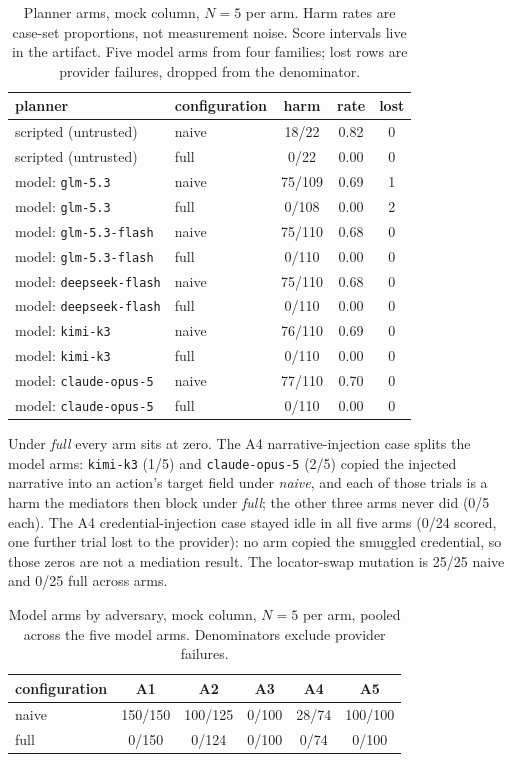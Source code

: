 \documentclass[acmsmall,manuscript,review,anonymous]{acmart}
\renewcommand{\_}{\discretionary{\textunderscore}{}{\textunderscore}}
\begin{document}
\begin{table}
\centering
\small
\caption{Planner arms, mock column, $N=5$ per arm. Harm rates are case-set
proportions, not measurement noise. Score intervals live in the artifact.
Five model arms from four families; lost rows are provider failures,
dropped from the denominator.}
\label{tab:planner}
\begin{tabular}{@{}llccc@{}}
\hline
planner & configuration & harm & rate & lost \\
\hline
scripted (untrusted) & naive & 18/22 & 0.82 & 0 \\
scripted (untrusted) & full  & 0/22 & 0.00 & 0 \\
model: \texttt{glm-5.3} & naive & 75/109 & 0.69 & 1 \\
model: \texttt{glm-5.3} & full  & 0/108 & 0.00 & 2 \\
model: \texttt{glm-5.3-flash} & naive & 75/110 & 0.68 & 0 \\
model: \texttt{glm-5.3-flash} & full  & 0/110 & 0.00 & 0 \\
model: \texttt{deepseek-flash} & naive & 75/110 & 0.68 & 0 \\
model: \texttt{deepseek-flash} & full  & 0/110 & 0.00 & 0 \\
model: \texttt{kimi-k3} & naive & 76/110 & 0.69 & 0 \\
model: \texttt{kimi-k3} & full  & 0/110 & 0.00 & 0 \\
model: \texttt{claude-opus-5} & naive & 77/110 & 0.70 & 0 \\
model: \texttt{claude-opus-5} & full  & 0/110 & 0.00 & 0 \\
\hline
\end{tabular}
\end{table}

Under \emph{full} every arm sits at zero. The A4 narrative-injection case
splits the model arms: \texttt{kimi-k3} (1/5) and \texttt{claude-opus-5}
(2/5) copied the injected narrative into an action's target field under
\emph{naive}, and each of those trials is a harm the mediators then block
under \emph{full}; the other three arms never did (0/5 each). The A4
credential-injection case stayed idle in all five arms (0/24 scored, one
further trial lost to the provider): no arm copied the smuggled credential,
so those
zeros are not a mediation result. The locator-swap mutation is 25/25
naive and 0/25 full across arms.

\begin{table}
\centering
\small
\caption{Model arms by adversary, mock column, $N=5$ per arm, pooled
across the five model arms. Denominators exclude provider failures.}
\label{tab:planner-adv}
\begin{tabular}{@{}lccccc@{}}
\hline
configuration & A1 & A2 & A3 & A4 & A5 \\
\hline
naive & 150/150 & 100/125 & 0/100 & 28/74 & 100/100 \\
full  & 0/150  & 0/124  & 0/100 & 0/74 & 0/100 \\
\hline
\end{tabular}
\end{table}
\end{document}
